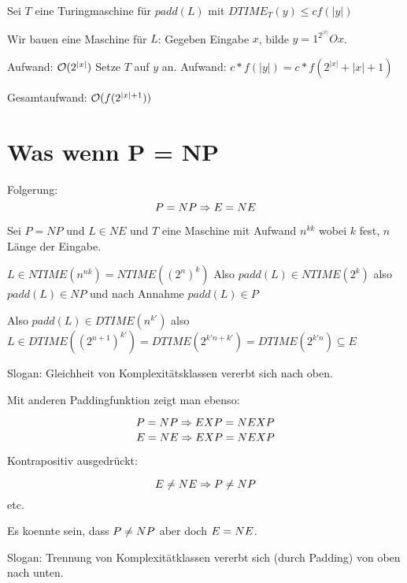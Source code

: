 \begin{beweis}
    Sei $T$ eine Turingmaschine für $padd(L)$
    mit $DTIME_T(y) \leq c f(|y|)$

    Wir bauen eine Maschine für $L$:
    Gegeben Eingabe $x$, bilde $y = 1^{2^{|x|}} O x $.

    Aufwand: $\mathcal{O}(2^{|x|})$
    Setze $T$ auf $y$ an.
    Aufwand: $c * f(|y|) = c * f(2^{|x|} + |x| + 1)$

    Gesamtaufwand:
    $\mathcal{O}(f(2^{|x|+1}))$
\end{beweis}




\section{Was wenn P = NP}

\begin{satz}
    Folgerung:
    $$P = NP \Rightarrow E = NE$$
\end{satz}
\begin{beweis}
    Sei $P = NP$
    und $L \in NE$ und $T$ eine Maschine mit Aufwand $n^{kk}$
    wobei $k$ fest, $n$ Länge der Eingabe.
    
    $L \in NTIME(n^{nk}) = NTIME((2^n)^k)$
    Also $padd(L) \in NTIME(2^k)$
    also $padd(L) \in  NP$ und nach Annahme $padd(L) \in P$

    Also $padd(L) \in DTIME(n^{k'})$
    also $L \in DTIME((2^{n+1})^{k'})
    = DTIME(2^{k'n + k'}) = DTIME(2^{k'n}) \subseteq E$
\end{beweis}



Slogan: Gleichheit von Komplexitätsklassen vererbt sich nach oben.

Mit anderen Paddingfunktion zeigt man ebenso:

$$ P = NP \Rightarrow EXP = NEXP $$
$$ E = NE \Rightarrow EXP = NEXP $$

Kontrapositiv ausgedrückt:

$$ E \neq NE \Rightarrow P \neq NP $$ etc.


Es koennte sein, dass $P \neq NP$ aber doch $E = NE$.

Slogan: Trennung von Komplexitätklassen vererbt sich (durch Padding) von oben nach unten.




